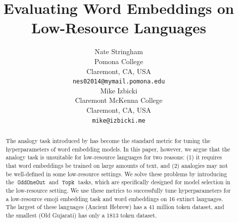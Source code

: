 \documentclass[11pt,a4paper]{article}
\title{Evaluating Word Embeddings on Low-Resource Languages}
\author{Nate Stringham\\
  Pomona College \\
  Claremont, CA, USA\\
  \texttt{nes02014@mymail.pomona.edu} \\\And
  Mike Izbicki \\
Claremont McKenna College \\
Claremont, CA, USA \\
  \texttt{mike@izbicki.me} \\}
\date{}
\DeclareMathOperator{\OddOneOut}{\texttt{OddOneOut}}
\DeclareMathOperator{\topk}{\texttt{Topk}}
\begin{document}
\maketitle
\begin{abstract}
    The analogy task introduced by \citet{mikolov2013efficient} has become the standard metric for tuning the hyperparameters of word embedding models.
    In this paper, however, we argue that the analogy task is unsuitable for low-resource languages for two reasons: 
    (1) it requires that word embeddings be trained on large amounts of text,
    and (2) analogies may not be well-defined in some low-resource settings.
    We solve these problems by introducing the $\OddOneOut$ and $\topk$ tasks,
    which are specifically designed for model selection in the low-resource setting.
    We use these metrics to successfully tune hyperparameters for a low-resource emoji embedding task and word embeddings on 16 extinct languages.    
    The largest of these languages (Ancient Hebrew) has a 41 million token dataset, 
    and the smallest (Old Gujarati) has only a 1813 token dataset.


\end{abstract}
\end{document}
